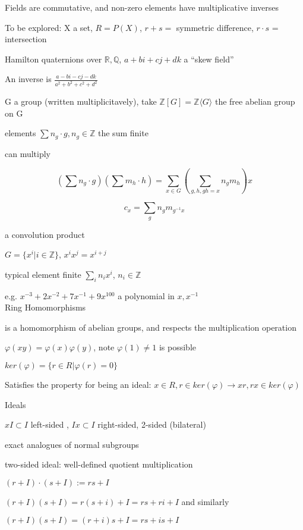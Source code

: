 \documentclass[12pt]{article}
\begin{document}
Fields are commutative, and non-zero elements have multiplicative inverses

\noindent
To be explored: X a set, $R = P(X)$, $r + s =$ symmetric difference, $r \cdot s$ = intersection

\noindent
Hamilton quaternions over $\mathds{R}, \mathds{Q}$, $a + bi + cj + dk$ a ``skew field''

An inverse is $\frac{a - bi - cj - dk}{a^2 + b^2 + c^2 + d^2}$

\noindent
G a group (written multiplicitavely), take $\mathds{Z}[G] = \mathds{Z}\langle G \rangle$ the free abelian group on G

elements $\sum n_g \cdot g, n_g \in \mathds{Z}$ the sum finite

can multiply

$$(\sum n_g \cdot g)(\sum m_h \cdot h) = \sum_{x \in G} (\sum_{g, h, gh= x}n_g m_h)x$$

$$c_x = \sum_g n_g m_{g^{-1}x}$$

a convolution product

\noindent
$G = \{x^i | i \in \mathds{Z}\}$, $x^ix^j = x^{i + j}$

typical element finite $\sum_i n_i x^i$, $n_i \in \mathds{Z}$

e.g. $x^{-3} + 2x^{-2} + 7x^{-1} + 9x^{100}$ a polynomial in $x, x^{-1}$\\

\noindent
Ring Homomorphisms

is a homomorphism of abelian groups, and respects the multiplication operation

$\varphi(xy) = \varphi(x)\varphi(y)$, note $\varphi(1) \neq 1$ is possible

$ker(\varphi) = \{r \in R | \varphi(r) = 0\}$

Satisfies the property for being an ideal: $x \in R, r \in ker(\varphi) \to xr, rx \in ker(\varphi)$

\noindent
Ideals

$xI \subset I$ left-sided , $Ix \subset I$ right-sided, 2-sided (bilateral)

exact analogues of normal subgroups

\noindent
two-sided ideal: well-defined quotient multiplication

$(r + I) \cdot (s + I) := rs + I$

$(r + I)(s + I) = r(s + i) + I = rs + ri + I$ and similarly

$(r + I)(s + I) = (r + i)s + I = rs + is + I$
\end{document}
